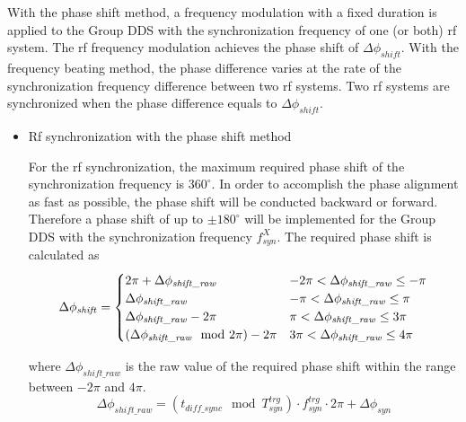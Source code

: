 With the phase shift method, a frequency modulation with a fixed duration is applied to the Group DDS with the synchronization frequency of one (or both) rf system. The rf frequency modulation achieves the phase shift of $\Delta \phi_\mathit{shift}$. With the frequency beating method, the phase difference varies at the rate of the synchronization frequency difference between two rf systems. Two rf systems are synchronized when the phase difference equals to $\Delta \phi_\mathit{shift}$. 

\begin{itemize}
\item Rf synchronization with the phase shift method

 
For the rf synchronization, the maximum required phase shift of the synchronization frequency is $360^\circ$. In order to accomplish the phase alignment as fast as possible, the phase shift will be conducted backward or forward. Therefore a phase shift of up to $\pm 180^\circ$ will be implemented for the Group DDS with the synchronization frequency $f_\mathit{syn}^X$. The required phase shift is calculated as
\begin{eqnarray}\Delta \phi_\mathit{shift}=
\begin{cases} 
2\pi+ \Delta \phi_\mathit{shift\_raw} & -2\pi<\Delta \phi_\mathit{shift\_raw}\le-\pi \cr

\Delta \phi_\mathit{shift\_raw} & -\pi<\Delta \phi_\mathit{shift\_raw}\le\pi \cr

\Delta \phi_\mathit{shift\_raw} -2\pi &  \pi<\Delta \phi_\mathit{shift\_raw}\le3\pi \cr

(\Delta \phi_\mathit{shift\_raw} \mod 2\pi) -2\pi &  3\pi<\Delta \phi_\mathit{shift\_raw}\le4\pi 

\label{phase_shift_eq}
\end{cases}
\end{eqnarray}

where $\Delta \phi_\mathit{shift\_raw}$ is the raw value of the required phase shift within the range between $-2\pi$ and $4\pi$.
 \begin{equation}
\Delta \phi_\mathit{shift\_raw}= (t_{\mathit{diff\_sync}} \mod T_\mathit{syn}^\mathit{trg}) \cdot f_\mathit{syn}^\mathit{trg}\cdot 2\pi +\Delta \phi_\mathit{syn}
\end{equation}


\end{itemize}

